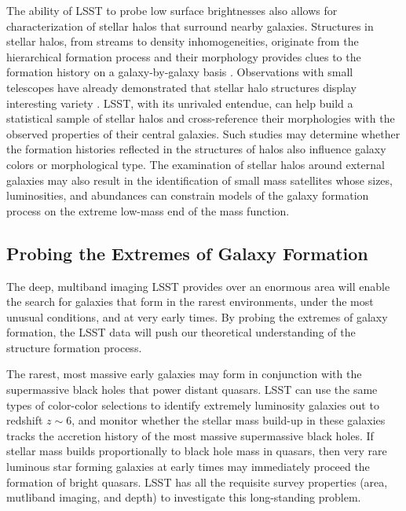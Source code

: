 The ability of LSST to probe low surface brightnesses
also allows for characterization of stellar halos that
surround nearby galaxies. Structures in stellar halos,
from streams to density inhomogeneities, originate
from the hierarchical formation process and their
morphology provides clues to the formation history
on a galaxy-by-galaxy basis \citep{bullock2005a,johnston2008a}.
Observations with small telescopes \citep{martinez-delgado2008a,abraham2014a}
have already 
demonstrated that stellar halo structures display interesting
variety
\citep[e.g.,][]{van_dokkum2014a}. 
LSST, with its unrivaled entendue, can help build a statistical
sample of stellar halos and cross-reference their morphologies
with the observed properties of their central galaxies. Such
studies may determine whether the formation histories reflected
in the structures of halos also influence galaxy colors or
morphological type. The
examination of stellar halos around external galaxies may
also result in the identification of small mass satellites
whose sizes, luminosities, and abundances can constrain
models of the galaxy formation process on the extreme
low-mass end of the mass function.

\subsection{Probing the Extremes of Galaxy Formation}
\label{sec:sci:gal:bkgnd:rare}

The deep, multiband imaging LSST provides over an enormous
area will enable the search for galaxies that form in the
rarest environments, under the most unusual conditions,
and at very early times. By probing the extremes of
galaxy formation, the LSST data will push our theoretical
understanding of the structure formation process.

The rarest, most massive early galaxies may form in 
conjunction with the supermassive black holes that
power distant quasars. LSST can use the same
types of color-color selections to identify extremely
luminosity galaxies out to redshift $z\sim6$, and
monitor whether the stellar mass build-up in these
galaxies tracks the accretion history of the most
massive supermassive black holes. If stellar mass
builds proportionally to black hole mass in quasars,
then very rare luminous star forming galaxies at
early times may immediately proceed the formation
of bright quasars. LSST has all the requisite
survey properties (area, mutliband imaging, and
depth) to investigate this long-standing problem.

